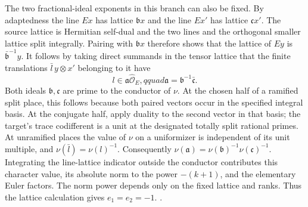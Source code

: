The two fractional-ideal exponents in this branch can also be fixed.
By adaptedness the line \(Ex\) has lattice \(\mathfrak b x\) and
the line \(Ex'\) has lattice \(\mathfrak c x'\). The source lattice
is Hermitian self-dual and the two lines and the orthogonal smaller
lattice split integrally. Pairing with \(\mathfrak b x\) therefore
shows that the lattice of \(Ey\) is \(\bar{\mathfrak b}^{-1}y\).
It follows by taking direct summands in the tensor lattice that the
finite translations \(\bar l\,y\otimes x'\) belonging to it have
\[
                l\in\mathfrak a\widehat{\mathcal O}_E,qquad
                \mathfrak a=\mathfrak b^{-1}\bar{\mathfrak c}.
\]
Both ideals \(\mathfrak b,\mathfrak c\) are prime to the conductor
of \(\nu\). At the chosen half of a ramified split place, this
follows because both paired vectors occur in the specified integral
basis. At the conjugate half, apply duality to the second vector in
that basis; the target's trace codifferent is a unit at the
designated totally split rational primes. At unramified places
the value of \(\nu\) on a uniformizer is independent of its unit
multiple, and \(\nu(\bar l)=\nu(l)^{-1}\). Consequently
\(\nu(\mathfrak a)=\nu(\mathfrak b)^{-1}
\nu(\mathfrak c)^{-1}\). Integrating the line-lattice indicator
outside the conductor contributes this character value, its absolute
norm to the power \(-(k+1)\), and the elementary Euler factors.
The norm power depends only on the fixed lattice and ranks.
Thus the lattice calculation gives \(e_1=e_2=-1\).
.

